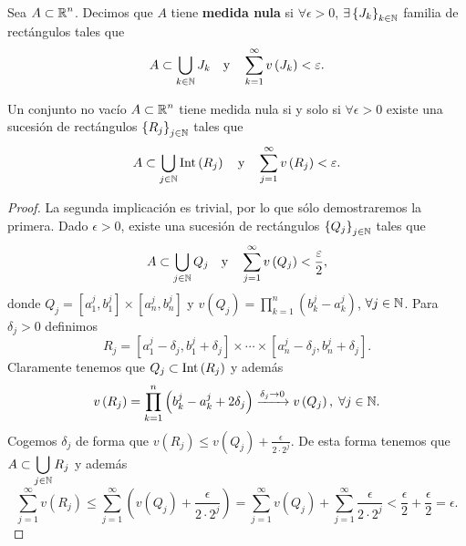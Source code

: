 \begin{definition}
	Sea $\displaystyle A \subset \mathbb{R}^{n} $. Decimos que $\displaystyle A $ tiene \textbf{medida nula} si $\displaystyle \forall \epsilon > 0 $, $\displaystyle \exists \left\{ J_{k}\right\} _{k \in \mathbb{N}} $ familia de rectángulos tales que 
	\[A \subset \bigcup_{k \in \mathbb{N}}J_{k} \quad \text{y} \quad \sum^{\infty}_{k = 1}v\left(J_{k}\right) < \varepsilon  .\]
\end{definition}
\begin{lema}
	Un conjunto no vacío $\displaystyle A \subset \mathbb{R}^{n} $ tiene medida nula si y solo si $\displaystyle \forall \epsilon > 0 $ existe una sucesión de rectángulos $\displaystyle \left\{ R_{j}\right\} _{j \in \mathbb{N}} $ tales que 
	\[ A \subset \bigcup_{j \in \mathbb{N}}\operatorname{Int}\left(R_{j}\right) \quad \text{y}\quad \sum^{\infty}_{j = 1}v\left(R_{j}\right) < \varepsilon  .\]
\end{lema}
\begin{proof}
	La segunda implicación es trivial, por lo que sólo demostraremos la primera. Dado $\displaystyle \epsilon > 0 $, existe una sucesión de rectángulos $\displaystyle \left\{ Q_{j}\right\} _{j \in \mathbb{N}} $ tales que 
	\[A \subset \bigcup_{j \in \mathbb{N}}Q_{j} \quad \text{y}\quad \sum^{\infty}_{j= 1}v\left(Q_{j}\right)< \frac{\varepsilon }{2} ,\]
	donde $\displaystyle Q_{j} = \left[a_{1}^{j}, b_{1}^{j}\right] \times \left[a_{n}^{j}, b_{n}^{j}\right]  $ y $\displaystyle v\left(Q_{j}\right)=\prod^{n}_{k=1}\left(b^{j}_{k}-a^{j}_{k}\right) $, $\displaystyle \forall j \in \mathbb{N} $. Para $\displaystyle \delta_{j} > 0 $ definimos
	\[R_{j}=\left[a_{1}^{j}-\delta_{j}, b_{1}^{j}+\delta_{j}\right] \times \cdots \times \left[a_{n}^{j}-\delta_{j}, b_{n}^{j}+\delta_{j}\right]  .\]
Claramente tenemos que $\displaystyle Q_{j}\subset \operatorname{Int}\left(R_{j}\right) $ y además
\[v\left(R_{j}\right) = \prod^{n}_{k = 1}\left(b^{j}_{k}-a^{j}_{k}+2\delta_{j}\right)\xrightarrow{\delta_{j}\to0}v\left(Q_{j}\right), \; \forall j \in \mathbb{N} .\]
Cogemos $\displaystyle \delta_{j} $ de forma que $\displaystyle v\left(R_{j}\right) \leq v\left(Q_{j}\right)+\frac{\epsilon }{2 \cdot 2^{j}} $. De esta forma tenemos que $\displaystyle A \subset \bigcup_{j \in \mathbb{N}}R_{j} $ y además
\[\sum^{\infty}_{j = 1}v\left(R_{j}\right) \leq \sum^{\infty}_{j = 1}\left(v\left(Q_{j}\right)+\frac{\epsilon }{2 \cdot 2^{j}}\right)=\sum^{\infty}_{j = 1}v\left(Q_{j}\right) + \sum^{\infty}_{j = 1}\frac{\epsilon }{2 \cdot 2^{j}} < \frac{\epsilon }{2} + \frac{\epsilon }{2} = \epsilon.\]
\end{proof}


